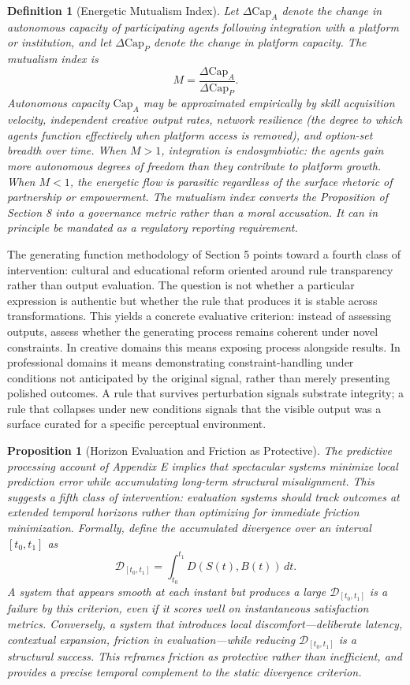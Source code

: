 \documentclass[11pt]{article}
\newtheorem{definition}{Definition}
\newtheorem{proposition}{Proposition}
\begin{document}
\begin{definition}[Energetic Mutualism Index]
Let $\Delta \mathrm{Cap}_A$ denote the change in autonomous capacity of participating agents following integration with a platform or institution, and let $\Delta \mathrm{Cap}_P$ denote the change in platform capacity. The mutualism index is
\[
M = \frac{\Delta \mathrm{Cap}_A}{\Delta \mathrm{Cap}_P}.
\]
Autonomous capacity $\mathrm{Cap}_A$ may be approximated empirically by skill acquisition velocity, independent creative output rates, network resilience (the degree to which agents function effectively when platform access is removed), and option-set breadth over time. When $M > 1$, integration is endosymbiotic: the agents gain more autonomous degrees of freedom than they contribute to platform growth. When $M < 1$, the energetic flow is parasitic regardless of the surface rhetoric of partnership or empowerment. The mutualism index converts the Proposition of Section 8 into a governance metric rather than a moral accusation. It can in principle be mandated as a regulatory reporting requirement.
\end{definition}

The generating function methodology of Section 5 points toward a fourth class of intervention: cultural and educational reform oriented around rule transparency rather than output evaluation. The question is not whether a particular expression is authentic but whether the rule that produces it is stable across transformations. This yields a concrete evaluative criterion: instead of assessing outputs, assess whether the generating process remains coherent under novel constraints. In creative domains this means exposing process alongside results. In professional domains it means demonstrating constraint-handling under conditions not anticipated by the original signal, rather than merely presenting polished outcomes. A rule that survives perturbation signals substrate integrity; a rule that collapses under new conditions signals that the visible output was a surface curated for a specific perceptual environment.

\begin{proposition}[Horizon Evaluation and Friction as Protective]
The predictive processing account of Appendix E implies that spectacular systems minimize local prediction error while accumulating long-term structural misalignment. This suggests a fifth class of intervention: evaluation systems should track outcomes at extended temporal horizons rather than optimizing for immediate friction minimization. Formally, define the accumulated divergence over an interval $[t_0, t_1]$ as
\[
\mathcal{D}_{[t_0,t_1]} = \int_{t_0}^{t_1} D(S(t), B(t))\, dt.
\]
A system that appears smooth at each instant but produces a large $\mathcal{D}_{[t_0,t_1]}$ is a failure by this criterion, even if it scores well on instantaneous satisfaction metrics. Conversely, a system that introduces local discomfort---deliberate latency, contextual expansion, friction in evaluation---while reducing $\mathcal{D}_{[t_0,t_1]}$ is a structural success. This reframes friction as protective rather than inefficient, and provides a precise temporal complement to the static divergence criterion.
\end{proposition}
\end{document}
